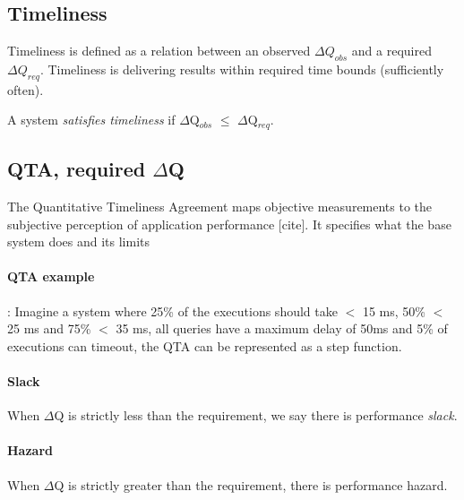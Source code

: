     \subsection{Timeliness}
        Timeliness is defined as a relation between an observed $\Delta Q_{obs}$ and a required $\Delta Q_{req}$. Timeliness is delivering results within required time bounds (sufficiently often). 

        A system \textit{satisfies timeliness} if $\Delta$Q$_{obs}$ $\le$ $\Delta$Q$_{req}$.
     
    \subsection{QTA, required $\Delta$Q}
         The Quantitative Timeliness Agreement maps objective measurements to the subjective perception of application performance [cite]. It specifies what the base system does and its limits
         \paragraph{QTA example}: Imagine a system where 25\% of the executions should take $<$ 15 ms, 50\% $<$ 25 ms and 75\% $<$ 35 ms, all queries have a maximum delay of 50ms and 5\% of executions can timeout, the QTA can be represented as a step function.
    
        \paragraph{Slack} When $\Delta$Q is strictly less than the requirement, we say there is performance \textit{slack}.

        \paragraph{Hazard} When $\Delta$Q is strictly greater than the requirement, there is performance hazard.

